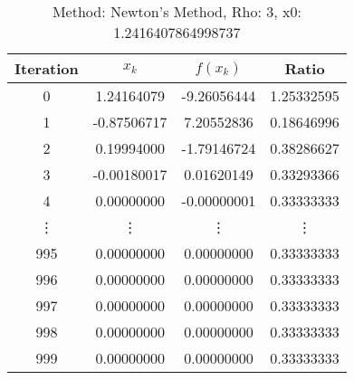 \begin{table}
\centering
\caption{Method: Newton's Method, Rho: 3, x0: 1.2416407864998737}
\label{tab:table_Newton's_Method_3_1_2416407864998737}
\begin{tabular}{c c c c}
\toprule
Iteration &       $x_k$ &    $f(x_k)$ &      Ratio \\
\midrule
        0 &  1.24164079 & -9.26056444 & 1.25332595 \\
        1 & -0.87506717 &  7.20552836 & 0.18646996 \\
        2 &  0.19994000 & -1.79146724 & 0.38286627 \\
        3 & -0.00180017 &  0.01620149 & 0.33293366 \\
        4 &  0.00000000 & -0.00000001 & 0.33333333 \\
   \vdots &      \vdots &      \vdots &     \vdots \\
      995 &  0.00000000 &  0.00000000 & 0.33333333 \\
      996 &  0.00000000 &  0.00000000 & 0.33333333 \\
      997 &  0.00000000 &  0.00000000 & 0.33333333 \\
      998 &  0.00000000 &  0.00000000 & 0.33333333 \\
      999 &  0.00000000 &  0.00000000 & 0.33333333 \\
\bottomrule
\end{tabular}
\end{table}

